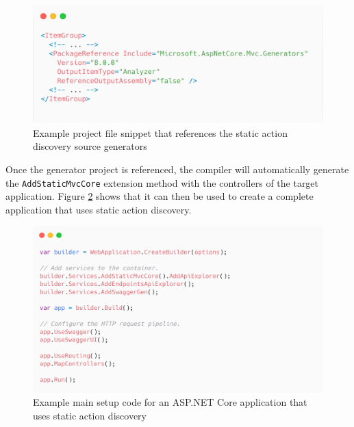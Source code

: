 \begin{figure}[H]
\centering
\includegraphics[width=\linewidth]{graphics/package-reference.png}
\caption{Example project file snippet that references the static action discovery source generators}
\label{fig:package-reference}
\end{figure}

Once the generator project is referenced, the compiler will automatically generate the \texttt{AddStaticMvcCore} extension method with the controllers of the target application. Figure \ref{fig:static-startup-method} shows that it can then be used to create a complete application that uses static action discovery.

\begin{figure}[H]
\centering
\includegraphics[width=\linewidth]{graphics/startup-method.png}
\caption{Example main setup code for an ASP.NET Core application that uses static action discovery}
\label{fig:static-startup-method}
\end{figure}